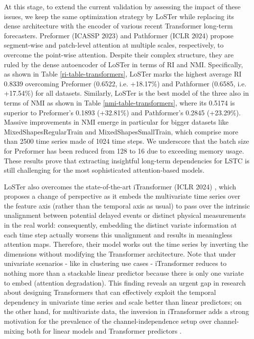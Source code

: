 \documentclass[times, review, 10pt]{elsarticle}
\begin{document}
At this stage, to extend the current validation by assessing the impact of these issues, we keep the same optimization strategy by LoSTer while replacing its dense architecture with the encoder of various recent Transformer long-term forecasters. Preformer (ICASSP 2023) \cite{du2023preformer} and Pathformer (ICLR 2024) \cite{chenpathformer} propose segment-wise and patch-level attention at multiple scales, respectively, to overcome the point-wise attention. Despite their complex structure, they are ruled by the dense autoencoder of LoSTer in terms of RI and NMI. Specifically, as shown in Table \ref{ri-table-transformers}, LoSTer marks the highest average RI 0.8339 overcoming Preformer (0.6522, i.e. +18.17\%) and Pathformer (0.6585, i.e. +17.54\%) for all datasets. Similarly, LoSTer is the best model of the three also in terms of NMI as shown in Table \ref{nmi-table-transformers}, where its 0.5174 is superior to Preformer's 0.1893 (+32.81\%) and Pathformer's 0.2845 (+23.29\%). Massive improvements in NMI emerge in particular for bigger datasets like MixedShapesRegularTrain and MixedShapesSmallTrain, which comprise more than 2500 time series made of 1024 time steps. We underscore that the batch size for Preformer has been reduced from 128 to 16 due to exceeding memory usage. These results prove that extracting insightful long-term dependencies for LSTC is still challenging for the most sophisticated attention-based models.

LoSTer also overcomes the state-of-the-art iTransformer (ICLR 2024) \cite{liuitransformer}, which proposes a change of perspective as it embeds the multivariate time series over the feature axis (rather than the temporal axis as usual) to pass over the intrinsic unalignment between potential delayed events or distinct physical measurements in the real world: consequently, embedding the distinct variate information at each time step actually worsens this unalignment and results in meaningless attention maps. Therefore, their model works out the time series by inverting the dimensions without modifying the Transformer architecture. Note that under univariate scenarios  - like in clustering use cases - iTransformer reduces to nothing more than a stackable linear predictor because there is only one variate to embed (attention degradation). This finding reveals an urgent gap in research about designing Transformers that can effectively exploit the temporal dependency in univariate time series and scale better than linear predictors; on the other hand, for multivariate data, the inversion in iTransformer adds a strong motivation for the prevalence of the channel-independence setup over channel-mixing both for linear models and Transformer predictors \cite{Yuqietal-2023-PatchTST}.
\end{document}
